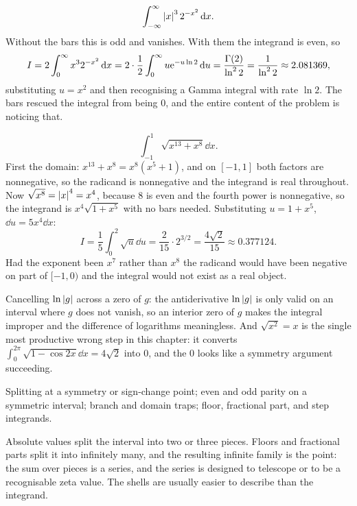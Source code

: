 \begin{worked}
\[\int_{-\infty}^{\infty}\left\lvert x\right\rvert^{3}2^{-x^{2}}\,\mathrm{d} x.\]
Without the bars this is odd and vanishes. With them the integrand is even, so
\[I=2\int_0^{\infty}x^{3}2^{-x^{2}}\,\mathrm{d} x=2\cdot\frac12\int_0^{\infty}u\mathrm{e}^{-u\ln2}\,\mathrm{d} u=\frac{\Gamma(2)}{\ln^{2}2}=\frac{1}{\ln^{2}2}\approx2.081369,\]
substituting $u=x^{2}$ and then recognising a Gamma integral with rate $\ln2$. The bars rescued the integral from being $0$, and the entire content of the problem is noticing that.
\end{worked}

\begin{worked}
\[\int_{-1}^{1}\sqrt{x^{13}+x^{8}}\dd x.\]
First the domain: $x^{13}+x^{8}=x^{8}(x^{5}+1)$, and on $[-1,1]$ both factors are nonnegative, so the radicand is nonnegative and the integrand is real throughout. Now $\sqrt{x^{8}}=\left\lvert x\right\rvert^{4}=x^{4}$, because $8$ is even and the fourth power is nonnegative, so the integrand is $x^{4}\sqrt{1+x^{5}}$ with no bars needed. Substituting $u=1+x^{5}$, $\dd u=5x^{4}\dd x$:
\[I=\frac15\int_0^{2}\sqrt u\dd u=\frac{2}{15}\cdot2^{3/2}=\frac{4\sqrt2}{15}\approx0.377124.\]
Had the exponent been $x^{7}$ rather than $x^{8}$ the radicand would have been negative on part of $[-1,0)$ and the integral would not exist as a real object.
\end{worked}

\begin{trap}
Cancelling $\ln\left\lvert g\right\rvert$ across a zero of $g$: the antiderivative $\ln\left\lvert g\right\rvert$ is only valid on an interval where $g$ does not vanish, so an interior zero of $g$ makes the integral improper and the difference of logarithms meaningless. And $\sqrt{x^{2}}=x$ is the single most productive wrong step in this chapter: it converts $\int_0^{2\pi}\sqrt{1-\cos2x}\dd x=4\sqrt2$ into $0$, and the $0$ looks like a symmetry argument succeeding.
\end{trap}

\begin{seealsob}Splitting at a symmetry or sign-change point; even and odd parity on a symmetric interval; branch and domain traps; floor, fractional part, and step integrands.\end{seealsob}

Absolute values split the interval into two or three pieces. Floors and fractional parts split it into infinitely many, and the resulting infinite family is the point: the sum over pieces is a series, and the series is designed to telescope or to be a recognisable zeta value. The shells are usually easier to describe than the integrand.

